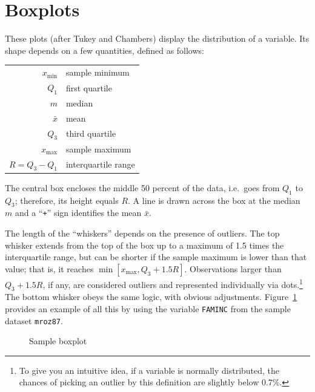 \pagebreak[4]

\section{Boxplots}
\label{sect-boxplots}

These plots (after Tukey and Chambers) display the distribution of a
variable. Its shape depends on a few quantities, defined as follows:

\begin{center}
\begin{tabular}{rl}
  $x_{\mathrm{min}}$ & sample minimum \\
  $Q_1$ & first quartile \\
  $m$ & median \\
  $\bar{x}$ & mean \\
  $Q_3$ & third quartile \\
  $x_{\mathrm{max}}$ & sample maximum\\
  $R = Q_3 - Q_1$ & interquartile range\\
\end{tabular}
\end{center}

The central box encloses the middle 50 percent of the data, i.e.\ goes
from $Q_1$ to $Q_3$; therefore, its height equals $R$.  A line
is drawn across the box at the median $m$ and a ``\texttt{+}'' sign
identifies the mean $\bar{x}$.

The length of the ``whiskers'' depends on the presence of
outliers. The top whisker extends from the top of the box up to a
maximum of 1.5 times the interquartile range, but can be shorter if
the sample maximum is lower than that value; that is, it reaches
$\min[x_{\mathrm{max}}, Q_3 + 1.5 R]$. Observations larger than
$Q_3 + 1.5 R$, if any, are considered outliers and represented
individually via dots.\footnote{To give you an intuitive idea, if a
  variable is normally distributed, the chances of picking an outlier
  by this definition are slightly below 0.7\%.} The bottom whisker
obeys the same logic, with obvious adjustments.
Figure~\ref{fig-boxplot} provides an example of all this by using the
variable \texttt{FAMINC} from the sample dataset \texttt{mroz87}.

\begin{figure}[htbp]
  \begin{flushleft}
    \hspace{1cm}
  
  \end{flushleft}
  \caption{Sample boxplot}
  \label{fig-boxplot}
\end{figure}

